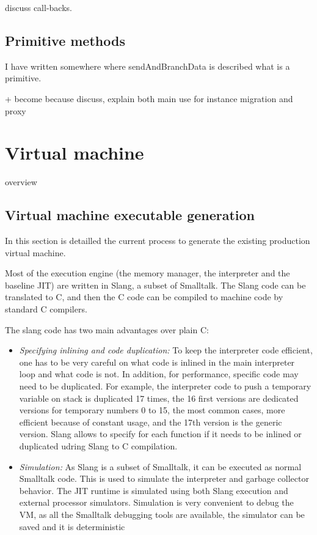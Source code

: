 \documentclass[a4paper,12pt,twoside]{../includes/ThesisStyle}
\begin{document}
discuss call-backs.

\subsection{Primitive methods}

I have written somewhere where sendAndBranchData is described what is a primitive.

+ become because discuss, explain both main use for instance migration and proxy

\section{Virtual machine}

overview

\subsection{Virtual machine executable generation}


\cite{Inga97a}

In this section is detailled the current process to generate the existing production virtual machine. 

Most of the execution engine (the memory manager, the interpreter and the baseline JIT) are written in Slang, a subset of Smalltalk. The Slang code can be translated to C, and then the C code can be compiled to machine code by standard C compilers.

The slang code has two main advantages over plain C:
\begin{itemize}
	\item \emph{Specifying inlining and code duplication:} To keep the interpreter code efficient, one has to be very careful on what code is inlined in the main interpreter loop and what code is not. In addition, for performance, specific code may need to be duplicated. For example, the interpreter code to push a temporary variable on stack is duplicated 17 times, the 16 first versions are dedicated versions for temporary numbers 0 to 15, the most common cases, more efficient because of constant usage, and the 17th version is the generic version. Slang allows to specify for each function if it needs to be inlined or duplicated udring Slang to C compilation.
	\item \emph{Simulation:} As Slang is a subset of Smalltalk, it can be executed as normal Smalltalk code. This is used to simulate the interpreter and garbage collector behavior. The JIT runtime is simulated using both Slang execution and external processor simulators. Simulation is very convenient to debug the VM, as all the Smalltalk debugging tools are available, the simulator can be saved and it is deterministic
\end{itemize}
\end{document}
